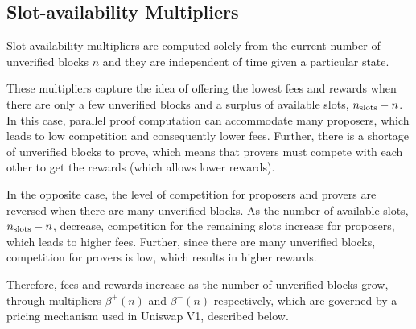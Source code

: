 \subsection{Slot-availability Multipliers}
\label{sec:slot_availability_multipliers}
Slot-availability multipliers are computed solely from the current number of unverified blocks $n$ and they are independent of time given a particular state.

These multipliers capture the idea of offering the lowest fees and rewards when there are only a few unverified blocks and a surplus of available slots, $n_\textnormal{slots}-n$. In this case, parallel proof computation can accommodate many proposers, which leads to low competition and consequently lower fees. Further, there is a shortage of unverified blocks to prove, which means that provers must compete with each other to get the rewards (which allows lower rewards).

In the opposite case, the level of competition for proposers and provers are reversed when there are many unverified blocks. As the number of available slots, $n_\textnormal{slots}-n$, decrease, competition for the remaining slots increase for proposers, which leads to higher fees. Further, since there are many unverified blocks, competition for provers is low, which results in higher rewards.


Therefore, fees and rewards increase as the number of unverified blocks grow, through multipliers $\beta^+(n)$ and $\beta^-(n)$ respectively, which are governed by a
pricing mechanism used in Uniswap V1, described below.


